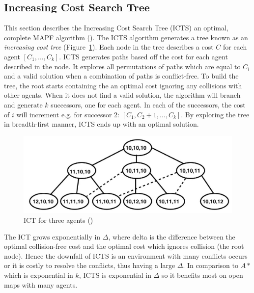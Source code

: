 \documentclass[a4paper,11pt]{article}
\begin{document}

\subsection{Increasing Cost Search Tree}
This section describes the Increasing Cost Search Tree (ICTS) an optimal, complete MAPF algorithm (\cite{sharon2011increasing}). The ICTS algorithm generates a tree known as an \textit{increasing cost tree} (Figure~\ref{fig:increasingcosttree}). Each node in the tree describes a cost $C$ for each agent $[C_1,\dots,C_k]$. ICTS generates paths based off the cost for each agent described in the node. It explores all permutations of paths which are equal to $C_i$ and a valid solution when a combination of paths is conflict-free.  To build the tree, the root starts containing the an optimal cost ignoring any collisions with other agents. When it does not find a valid solution, the algorithm will branch and generate $k$ successors, one for each agent. In each of the successors, the cost of $i$ will increment e.g. for successor 2: $[C_1,C_{2}+1,\dots,C_k]$. By exploring the tree in breadth-first manner, ICTS ends up with an optimal solution.

\begin{figure}[!htb]
	\centering
	\centering
	\includegraphics[width=0.9\linewidth]{graphics/ictstree}
	\caption{ICT for three agents (\cite{sharon2011increasing})}
	\label{fig:increasingcosttree}
\end{figure}

The ICT grows exponentially in $\Delta$, where delta is the difference between the optimal collision-free cost and the optimal cost which ignores collision (the root node). Hence the downfall of ICTS is an environment with many conflicts occurs or it is costly to resolve the conflicts, thus having a large $\Delta$. In comparison to $A*$ which is exponential in $k$, ICTS is exponential in $\Delta$ so it benefits most on open maps with many agents.
\end{document}

